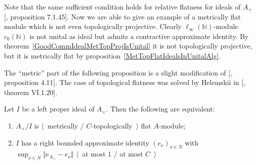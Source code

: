 Note that the same sufficient condition holds for relative flatness for ideals
of $A_\times$ [\cite{HelBanLocConvAlg}, proposition 7.1.45]. Now we are able to
give an example of a metrically flat module which is not even topologically
projective. Clearly $\ell_\infty(\mathbb{N})$-module $c_0(\mathbb{N})$ is not
unital as ideal but admits a contractive approximate identity. By
theorem~\ref{GoodCommIdealMetTopProjIsUnital} it is not topologically
projective, but it is metrically flat by
proposition~\ref{MetTopFlatIdealsInUnitalAlg}.

The ``metric'' part of the following proposition is a slight modification of
[\cite{WhiteInjmoduAlg}, proposition 4.11]. The case of topological flatness was
solved by Helemskii in [\cite{HelHomolBanTopAlg}, theorem VI.1.20].

\begin{proposition}\label{MetTopFlatCycModCharac} Let $I$ be a left proper ideal
of $A_\times $. Then the following are equivalent:

\begin{enumerate}[label = (\roman*)]
    \item $A_\times /I$ is $\langle$~metrically / $C$-topologically~$\rangle$
    flat $A$-module;

    \item $I$ has a right bounded approximate identity ${(e_\nu)}_{\nu\in N}$
    with $\sup_{\nu\in N}\Vert e_{A_\times }-e_\nu\Vert$ $\langle$~at most $1$ /
    at most $C$~$\rangle$
\end{enumerate}
\end{proposition}
